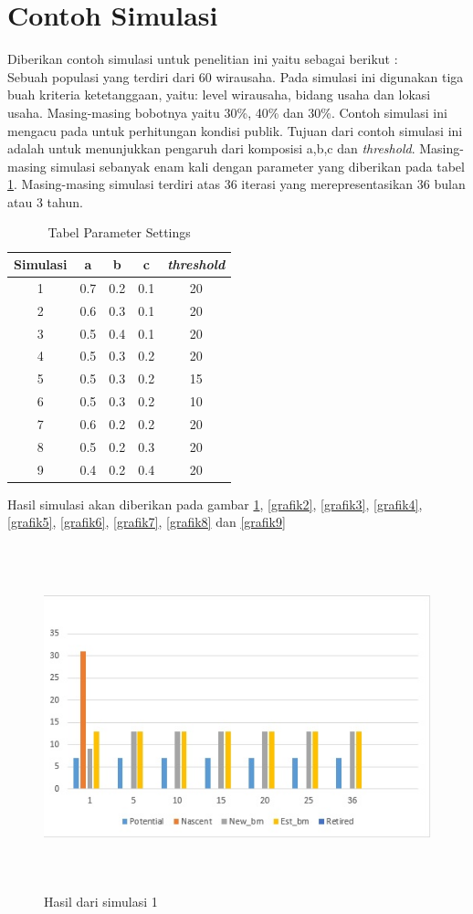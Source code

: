 \section{Contoh Simulasi}
Diberikan contoh simulasi untuk penelitian ini yaitu sebagai berikut :\\
Sebuah populasi yang terdiri dari 60 wirausaha. Pada simulasi ini digunakan tiga buah kriteria ketetanggaan, yaitu: level wirausaha, bidang usaha dan lokasi usaha. Masing-masing bobotnya yaitu 30\%, 40\% dan 30\%. Contoh simulasi ini mengacu pada \cite{GEM2013} untuk perhitungan kondisi publik. Tujuan dari contoh simulasi ini adalah untuk menunjukkan pengaruh dari komposisi a,b,c dan \textit{threshold}. Masing-masing simulasi sebanyak enam kali dengan parameter yang diberikan pada tabel \ref{tabelParameter}. Masing-masing simulasi terdiri atas 36 iterasi yang merepresentasikan 36 bulan atau 3 tahun.
\begin{table}[H]
\centering
\caption{Tabel Parameter Settings}
\begin{tabular}{|c|c|c|c|c|}
\hline
Simulasi & a & b & c & \textit{threshold}\\
\hline
1 & 0.7 & 0.2 & 0.1 & 20\\
\hline 
2 & 0.6 & 0.3 & 0.1 & 20\\
\hline
3 & 0.5 & 0.4 & 0.1 & 20\\
\hline
4 & 0.5 & 0.3 & 0.2 & 20\\
\hline
5 & 0.5 & 0.3 & 0.2 & 15\\
\hline
6 & 0.5 & 0.3 & 0.2 & 10\\
\hline
7 & 0.6 & 0.2 & 0.2 & 20\\
\hline
8 & 0.5 & 0.2 & 0.3 & 20\\
\hline
9 & 0.4 & 0.2 & 0.4 & 20\\
\hline 
\end{tabular}
\label{tabelParameter}
\end{table}
Hasil simulasi akan diberikan pada gambar \ref{grafik1}, \ref{grafik2}, \ref{grafik3}, \ref{grafik4}, \ref{grafik5}, \ref{grafik6}, \ref{grafik7}, \ref{grafik8} dan \ref{grafik9}
	\begin{figure} [H]
	\centering  
	\includegraphics[width=12cm, height=10cm]{grafik1} 
		\caption[Hasil dari simulasi]{Hasil dari simulasi 1}
	\label{grafik1} 
\end{figure}

